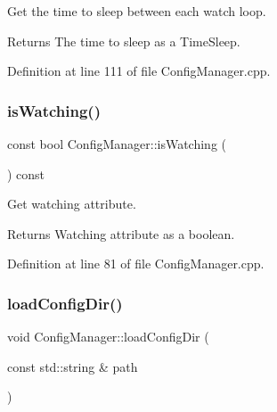 Get the time to sleep between each watch loop. 

\begin{DoxyReturn}{Returns}
The time to sleep as a Time\+Sleep. 
\end{DoxyReturn}


Definition at line 111 of file Config\+Manager.\+cpp.

\mbox{\label{classcfg_1_1_config_manager_a704e8f6b81715a24199f3579a946cad4}} 
\subsubsection{\texorpdfstring{is\+Watching()}{isWatching()}}
{\footnotesize\ttfamily const bool Config\+Manager\+::is\+Watching (\begin{DoxyParamCaption}{ }\end{DoxyParamCaption}) const\hspace{0.3cm}{\ttfamily [noexcept]}}



Get watching attribute. 

\begin{DoxyReturn}{Returns}
Watching attribute as a boolean. 
\end{DoxyReturn}


Definition at line 81 of file Config\+Manager.\+cpp.

\mbox{\label{classcfg_1_1_config_manager_ad6c55b0413f949cc5002467cbcee3186}} 
\subsubsection{\texorpdfstring{load\+Config\+Dir()}{loadConfigDir()}}
{\footnotesize\ttfamily void Config\+Manager\+::load\+Config\+Dir (\begin{DoxyParamCaption}\item[{const std\+::string \&}]{path }\end{DoxyParamCaption})}



